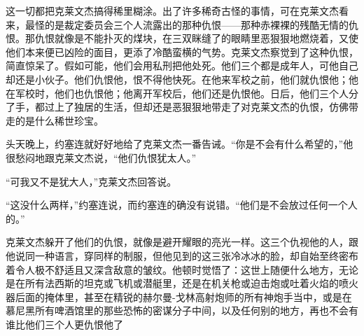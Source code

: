    这一切都把克莱文杰搞得稀里糊涂。出了许多稀奇古怪的事情，可在克莱文杰看来，最怪的是裁定委员会三个人流露出的那种仇恨——那种赤裸裸的残酷无情的仇恨。那仇恨就像是不能扑灭的煤块，在三双眯缝了的眼睛里恶狠狠地燃烧着，又使他们本来便已凶险的面目，更添了冷酷蛮横的气势。克莱文杰察觉到了这种仇恨，简直惊呆了。假如可能，他们会用私刑把他处死。他们三个都是成年人，可他自己却还是小伙子。他们仇恨他，恨不得他快死。在他来军校之前，他们就仇恨他；他在军校时，他们也仇恨他；他离开军校后，他们还是仇恨他。日后，他们三个人分了手，都过上了独居的生活，但却还是恶狠狠地带走了对克莱文杰的仇恨，仿佛带走的是什么稀世珍宝。

    头天晚上，约塞连就好好地给了克莱文杰一番告诫。“你是不会有什么希望的，”他很愁闷地跟克莱文杰说，“他们仇恨犹太人。”

    “可我又不是犹大人，”克莱文杰回答说。

    “这没什么两样，”约塞连说，而约塞连的确没有说错。“他们是不会放过任何一个人的。”

    克莱文杰躲开了他们的仇恨，就像是避开耀眼的亮光一样。这三个仇视他的人，跟他说同一种语言，穿同样的制服，但他见到的这三张冷冰冰的脸，却自始至终密布着令人极不舒适且又深含敌意的皱纹。他顿时觉悟了：这世上随便什么地方，无论是在所有法西斯的坦克或飞机或潜艇里，还是在机关枪或迫击炮或吐着火焰的喷火器后面的掩体里，甚至在精锐的赫尔曼-戈林高射炮师的所有神炮手当中，或是在慕尼黑所有啤酒馆里的那些恐怖的密谋分子中间，以及任何别的地方，再也不会有谁比他们三个人更仇恨他了
